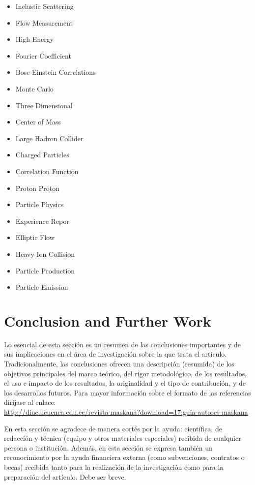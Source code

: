\documentclass[11pt]{article}
\begin{document}
\begin{multicols}{2}
    \begin{itemize}
	\item Inelastic Scattering
	\item Flow Measurement
	\item High Energy
	\item Fourier Coefficient
	\item Bose Einstein Correlations
	\item Monte Carlo
	\item Three Dimensional
	\item Center of Mass
	\item Large Hadron Collider
	\item Charged Particles
	\item Correlation Function
	\item Proton Proton
	\item Particle Physics
	\item Experience Repor
	\item Elliptic Flow
	\item Heavy Ion Collision
	\item Particle Production
	\item Particle Emission
    \end{itemize}
\end{multicols}


\section{Conclusion and Further Work}
\label{label:conlusionsfurtherwork}

Lo esencial de esta sección es un resumen de las conclusiones importantes y de sus
implicaciones en el área de investigación sobre la que trata el artículo. Tradicionalmente, las 
conclusiones ofrecen una descripción (resumida) de los objetivos principales del marco teórico, del 
rigor metodológico, de los resultados, el uso e impacto de los resultados, la originalidad y el tipo de 
contribución, y de los desarrollos futuros. Para mayor información sobre el formato de las referencias diríjase al enlace:\\ \url{http://diuc.ucuenca.edu.ec/revista-maskana?download=17:guia-autores-maskana}



\begin{acknowledgements} 
  En esta sección se agradece de manera cortés por la ayuda: científica, de redacción y 
técnica (equipo y otros materiales especiales) recibida de cualquier persona o institución. Además, en 
esta sección se expresa también un reconocimiento por la ayuda financiera externa (como 
subvenciones, contratos o becas) recibida tanto para la realización de la investigación como para la 
preparación del artículo. Debe ser breve.
\end{acknowledgements}





\end{document}
